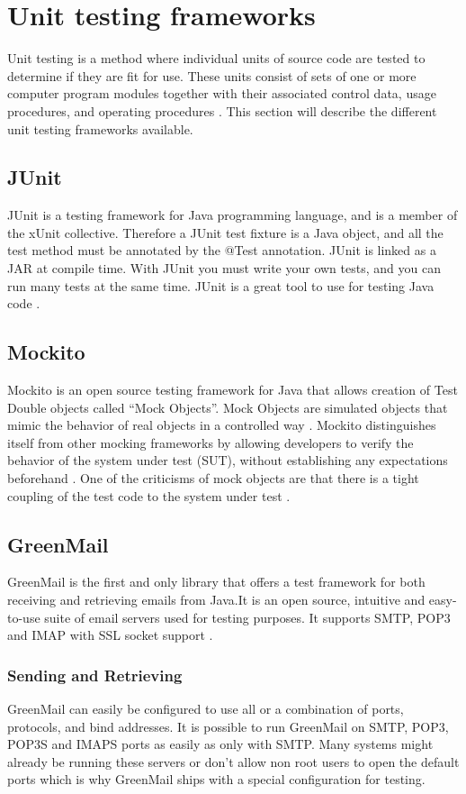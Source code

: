 \section{Unit testing frameworks}

Unit testing is a method where individual units of source code are tested to determine if they are fit for use. These units consist of sets of one or more computer program modules together with their associated control data, usage procedures, and operating procedures \cite{bib:kolawa}. This section will describe the different unit testing frameworks available.

\subsection{JUnit}
JUnit is a testing framework for Java programming language, and is a member of the xUnit collective. Therefore a JUnit test fixture is a Java object, and all the test method must be annotated by the @Test annotation. JUnit is linked as a JAR at compile time. With JUnit you must write your own tests, and you can run many tests at the same time. JUnit is a great tool to use for testing Java code \cite{bib:junit}.

\subsection{Mockito}
Mockito is an open source testing framework for Java that allows creation of Test Double objects called “Mock Objects”. Mock Objects are simulated objects that mimic the behavior of real objects in a controlled way \cite{bib:mock}.
\newline
\newline
Mockito distinguishes itself from other mocking frameworks by allowing developers to verify the behavior of the system under test (SUT), without establishing any expectations beforehand \cite{bib:mockito}.
One of the criticisms of mock objects are that there is a tight coupling of the test code to the system under test \cite{bib:mocks}.

\subsection{GreenMail}
GreenMail is the first and only library that offers a test framework for both receiving and retrieving emails from Java.It is an open source, intuitive and easy-to-use suite of email servers used for testing purposes. It supports SMTP, POP3 and IMAP with SSL socket support \cite{bib:greenmail}.


\subsubsection{Sending and Retrieving}
GreenMail can easily be configured to use all or a combination of ports, protocols, and bind addresses. It  is possible to run GreenMail on SMTP, POP3, POP3S and IMAPS ports as easily as only with SMTP. Many systems might already be running these servers or don’t allow non root users to open the default ports which is why GreenMail ships with a special configuration for testing.

\newpage